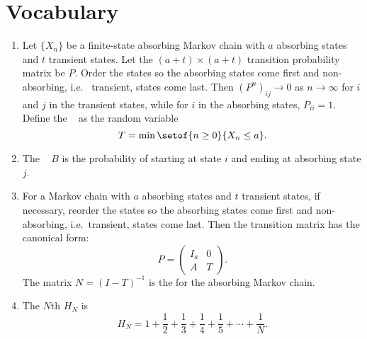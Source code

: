 \documentclass[12pt]{article}
\begin{document}
\section*{Vocabulary}
\begin{enumerate}
    \item
        Let \( \{ X_n \} \) be a finite-state absorbing Markov chain
        with \( a \) absorbing states and \( t \) transient states.  Let
        the \( (a + t) \times (a + t) \) transition probability matrix
        be \( P \).  Order the states so the absorbing states come first
        and non-absorbing, i.e.\ %
        transient, states come last.  Then \( \left(P^n \right)_{ij} \to
        0 \) as \( n \to \infty \) for \( i \) and \( j \) in the
        transient states, while for \( i \) in the absorbing states, \(
        P_{ii} = 1 \). Define the ~%
        as the random variable
        \[
            T = \min \setof{n \ge 0}{X_n \le a}.
        \]
    \item
        The ~%
        \( B \) is the probability of starting at state \( i \) and
        ending at absorbing state \( j \).
    \item
        For a Markov chain with \( a \) absorbing states and \( t \)
        transient states, if necessary, reorder the states so the
        absorbing states come first and non-absorbing, i.e.\ transient,
        states come last.  Then the transition matrix has the canonical
        form:
        \[
            P =
            \begin{pmatrix}
                I_a & 0 \\
                A & T
            \end{pmatrix}
            .
        \] The matrix \( N = (I-T)^{-1} \) is the %
        for the absorbing Markov chain.
    \item
        The \( N \)th  \( H_N \) is%
        \[
            H_N = 1 + \frac{1}{2} + \frac{1}{3} + \frac{1}{4} + \frac{1}
            {5} + \cdots + \frac{1}{N}.
        \]
\end{enumerate}

\hr
\end{document}

